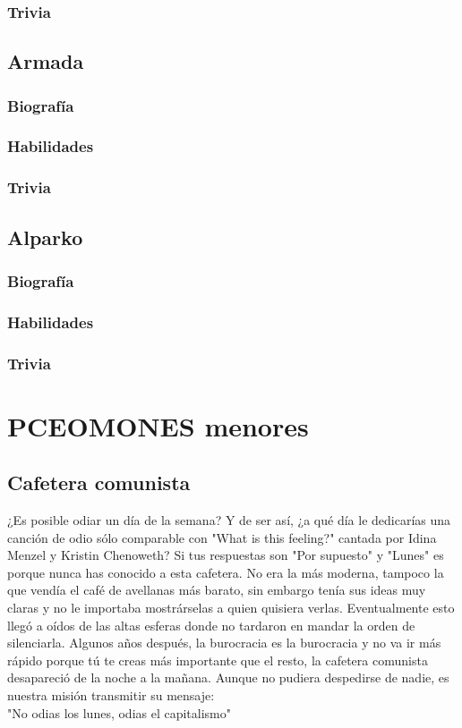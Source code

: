 \documentclass[letterpaper]{article}
\begin{document}
\subsubsection{Trivia}

\subsection{Armada}

\subsubsection{Biografía}

\subsubsection{Habilidades}

\subsubsection{Trivia}

\subsection{Alparko}

\subsubsection{Biografía}

\subsubsection{Habilidades}

\subsubsection{Trivia}
\section{PCEOMONES menores}
\subsection{Cafetera comunista}
¿Es posible odiar un día de la semana? Y de ser así, ¿a qué día le dedicarías una canción de odio sólo comparable con "What is this feeling?" cantada por Idina
Menzel y Kristin Chenoweth? Si tus respuestas son "Por supuesto" y "Lunes" es porque nunca has conocido a esta cafetera. No era la más moderna, tampoco la que
vendía el café de avellanas más barato, sin embargo tenía sus ideas muy claras y no le importaba mostrárselas a quien quisiera verlas. Eventualmente esto llegó a 
oídos de las altas esferas donde no tardaron en mandar la orden de silenciarla. Algunos años después, la burocracia es la burocracia y no va ir más rápido porque tú 
te creas más importante que el resto, la cafetera comunista desapareció de la noche a la mañana. Aunque no pudiera despedirse de nadie, es nuestra misión transmitir su mensaje:\\
 "No odias los lunes, odias el capitalismo"
\end{document}
